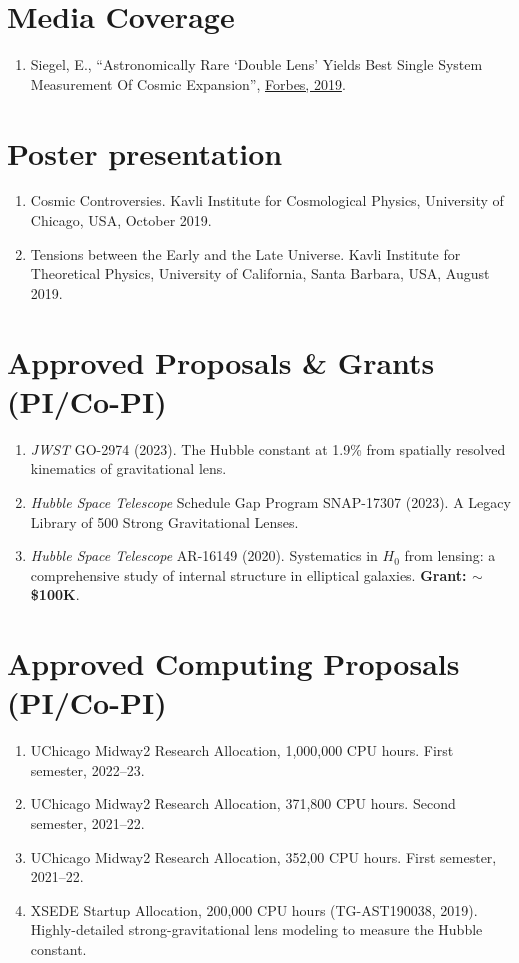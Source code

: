\documentclass[margin, line]{res}
\begin{document}
\begin{resume}
\section{\sc Media Coverage}
\begin{enumerate}
	\item Siegel, E., ``Astronomically Rare `Double Lens' Yields Best Single System Measurement Of Cosmic Expansion'', \href{https://www.forbes.com/sites/startswithabang/2019/10/28/astronomically-rare-double-lens-yields-best-single-system-measurement-of-cosmic-expansion/#55acbc504373}{Forbes, 2019}.	
\end{enumerate}


\section{\sc Poster presentation}
\begin{enumerate}
	\item Cosmic Controversies. Kavli Institute for Cosmological Physics, University of Chicago, USA, October 2019.
	\item Tensions between the Early and the Late Universe. Kavli Institute for Theoretical Physics, University of California, Santa Barbara, USA, August 2019.
\end{enumerate}

\section{\sc Approved Proposals \& Grants (PI/Co-PI)}
\begin{enumerate}
	\item \textit{JWST} GO-2974 (2023). The Hubble constant at 1.9\% from spatially resolved kinematics of gravitational lens.
	\item \textit{Hubble Space Telescope} Schedule Gap Program SNAP-17307 (2023). A Legacy Library of 500 Strong Gravitational Lenses.
	\item \textit{Hubble Space Telescope} AR-16149 (2020). Systematics in $H_0$ from lensing: a comprehensive study of internal structure in elliptical galaxies. \textbf{Grant: $\sim$\$100K}.
\end{enumerate}

\section{\sc Approved Computing Proposals (PI/Co-PI)}
\begin{enumerate}
\item UChicago Midway2 Research Allocation, 1,000,000 CPU hours. First semester, 2022--23.
\item UChicago Midway2 Research Allocation, 371,800 CPU hours. Second semester, 2021--22.
\item UChicago Midway2 Research Allocation, 352,00 CPU hours. First semester, 2021--22.
\item XSEDE Startup Allocation, 200,000 CPU hours (TG-AST190038, 2019). Highly-detailed strong-gravitational lens modeling to measure the Hubble constant.   
\end{enumerate}


\end{resume}
\end{document}
